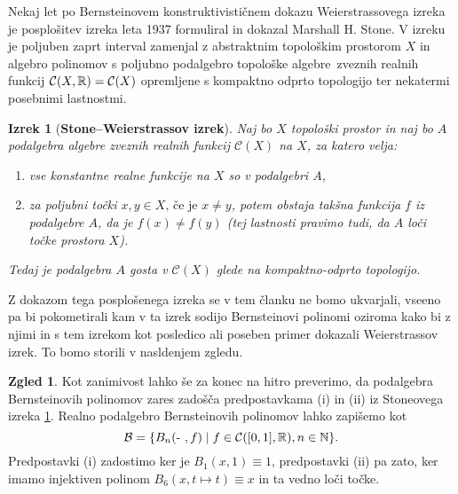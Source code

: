 \documentclass[a4paper, reqno]{amsart}
\theoremstyle{theorem}
\newtheorem{izrek}{Izrek}[section]
\theoremstyle{definition}
\newtheorem*{zgled*}{Zgled}
\begin{document}
\par
Nekaj let po Bernsteinovem konstruktivističnem dokazu Weierstrassovega
izreka je posplošitev izreka leta 1937 formuliral in dokazal
Marshall H. Stone. V izreku je poljuben zaprt interval zamenjal z abstraktnim
topološkim prostorom $X$ in algebro polinomov s poljubno podalgebro
topološke algebre zveznih realnih funkcij $\mathcal{C}(X, \mathbb{R}) = \mathcal{C}(X)$
opremljene s
kompaktno odprto topologijo ter nekatermi posebnimi lastnostmi.

\renewcommand{\labelenumi}{(\roman{enumi})}

\begin{izrek}[\textbf{Stone--Weierstrassov izrek}]
	\label{Stone} %
	Naj bo $X$ topološki prostor in naj bo $A$ podalgebra algebre zveznih
	realnih funkcij $\mathcal{C}(X)$ na $X$, za katero velja:
	\begin{enumerate}
		\item vse konstantne realne funkcije na $X$ so v podalgebri $A$,
		\item za poljubni točki $x, y \in X\text{, če je } x \neq y$, potem obstaja takšna
					funkcija $f$ iz podalgebre $A$, da je $f(x) \neq f(y)$ (tej
					lastnosti pravimo tudi, da $A$ loči točke prostora $X$). 
	\end{enumerate}
	Tedaj je podalgebra $A$ gosta v $\mathcal{C}(X)$ glede na kompaktno-odprto
	topologijo.
\end{izrek}

\par
Z dokazom tega posplošenega izreka se v tem članku ne bomo ukvarjali, vseeno
pa bi pokometirali kam v ta izrek sodijo Bernsteinovi polinomi oziroma kako
bi z njimi in s tem izrekom kot posledico ali poseben primer dokazali 
Weierstrassov izrek. To bomo storili v nasldenjem zgledu.

\begin{zgled*}
	Kot zanimivost lahko še za konec na hitro preverimo, da podalgebra Bernsteinovih
	polinomov zares zadošča predpostavkama (i) in (ii) iz Stoneovega izreka 
	\ref{Stone}. Realno podalgebro Bernsteinovih polinomov lahko zapišemo kot
	$$
	\mathcal{B} = \{B_n(\text{- }, f) \mid f \in \mathcal{C}([0,1],\mathbb{R}), n \in \mathbb{N}\}\text{.}
	$$
	Predpostavki (i) zadostimo ker je $B_1(x, 1) \equiv 1$, predpostavki (ii) pa zato,
	ker imamo injektiven polinom $B_6(x, t \mapsto t) \equiv x$ in ta vedno loči točke.
\end{zgled*}





\newpage
\end{document}
